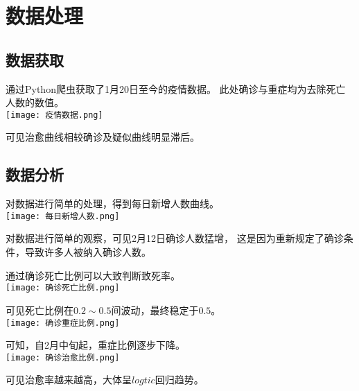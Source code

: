 \section{数据处理}
\subsection{数据获取}
通过Python爬虫获取了1月20日至今的疫情数据。
此处确诊与重症均为去除死亡人数的数值。
\\
\texttt{[image: 疫情数据.png]}
\par
可见治愈曲线相较确诊及疑似曲线明显滞后。
\subsection{数据分析}
对数据进行简单的处理，得到每日新增人数曲线。
\\
\texttt{[image: 每日新增人数.png]}
\par
对数据进行简单的观察，可见2月12日确诊人数猛增，
这是因为重新规定了确诊条件，导致许多人被纳入确诊人数。
\par
通过确诊死亡比例可以大致判断致死率。
\\
\texttt{[image: 确诊死亡比例.png]}
\par
可见死亡比例在$0.2\sim 0.5$间波动，最终稳定于$0.5$。
\\
\texttt{[image: 确诊重症比例.png]}
\par
可知，自2月中旬起，重症比例逐步下降。
\\
\texttt{[image: 确诊治愈比例.png]}
\par
可见治愈率越来越高，大体呈$logtic$回归趋势。


